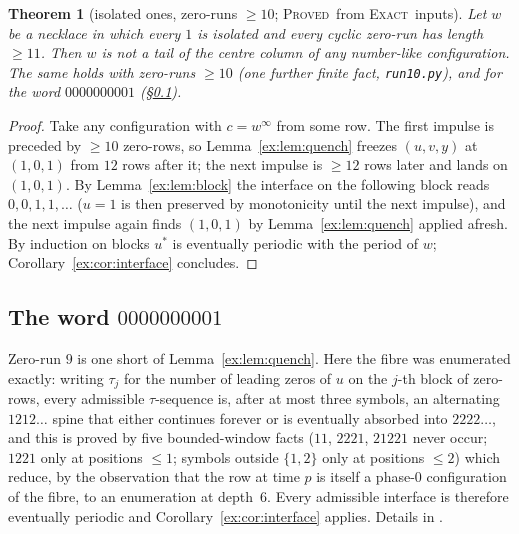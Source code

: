 \documentclass[11pt]{article}
\newtheorem{theorem}{Theorem}[section]
\theoremstyle{definition}
\theoremstyle{remark}
\newcommand{\PROVED}{\textsc{Proved}}
\newcommand{\EXACT}{\textsc{Exact}}
\begin{document}
\begin{theorem}[isolated ones, zero-runs $\ge10$; \PROVED\ from \EXACT\ inputs]\label{ex:thm:zeroruns}
Let $w$ be a necklace in which every $1$ is isolated and every cyclic zero-run has length $\ge11$. Then $w$ is not a tail of the centre column of any number-like configuration. The same holds with zero-runs $\ge10$ (one further finite fact, \texttt{run10.py}), and for the word $0000000001$ (\S\ref{ex:sec:spine}).
\end{theorem}
\begin{proof}
Take any configuration with $c=w^\infty$ from some row. The first impulse is preceded by $\ge10$ zero-rows, so Lemma~\ref{ex:lem:quench} freezes $(u,v,y)$ at $(1,0,1)$ from $12$ rows after it; the next impulse is $\ge12$ rows later and lands on $(1,0,1)$. By Lemma~\ref{ex:lem:block} the interface on the following block reads $0,0,1,1,\dots$ ($u=1$ is then preserved by monotonicity until the next impulse), and the next impulse again finds $(1,0,1)$ by Lemma~\ref{ex:lem:quench} applied afresh. By induction on blocks $u^*$ is eventually periodic with the period of $w$; Corollary~\ref{ex:cor:interface} concludes.
\end{proof}

\subsection{The word $0000000001$}\label{ex:sec:spine}
Zero-run $9$ is one short of Lemma~\ref{ex:lem:quench}. Here the fibre was enumerated exactly: writing $\tau_j$ for the number of leading zeros of $u$ on the $j$-th block of zero-rows, every admissible $\tau$-sequence is, after at most three symbols, an alternating $1212\ldots$ spine that either continues forever or is eventually absorbed into $2222\ldots$, and this is proved by five bounded-window facts ($11$, $2221$, $21221$ never occur; $1221$ only at positions $\le1$; symbols outside $\{1,2\}$ only at positions $\le2$) which reduce, by the observation that the row at time $p$ is itself a phase-$0$ configuration of the fibre, to an enumeration at depth~$6$. Every admissible interface is therefore eventually periodic and Corollary~\ref{ex:cor:interface} applies. Details in \cite[\S2]{Q}.
\end{document}
